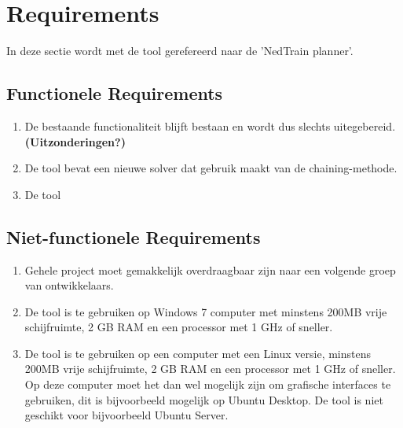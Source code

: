 \section{Requirements}
In deze sectie wordt met de tool gerefereerd naar de 'NedTrain planner'.

\subsection{Functionele Requirements}
\begin{enumerate}
    \item De bestaande functionaliteit blijft bestaan en wordt dus slechts uitegebereid. \textbf{(Uitzonderingen?)}
    \item De tool bevat een nieuwe solver dat gebruik maakt van de chaining-methode. 
    \item De tool
\end{enumerate}

\subsection{Niet-functionele Requirements}
\begin{enumerate}
    \item Gehele project moet gemakkelijk overdraagbaar zijn naar een volgende groep van ontwikkelaars. 
    \item De tool is te gebruiken op Windows 7 computer met minstens 200MB vrije schijfruimte, 2 GB RAM en een processor met 1 GHz of sneller.
    \item De tool is te gebruiken op een computer met een Linux versie, minstens 200MB vrije schijfruimte, 2 GB RAM en een processor met 1 GHz of sneller. Op deze computer moet het dan wel mogelijk zijn om grafische interfaces te gebruiken, dit is bijvoorbeeld mogelijk op Ubuntu Desktop. De tool is niet geschikt voor bijvoorbeeld Ubuntu Server. 
\end{enumerate}
